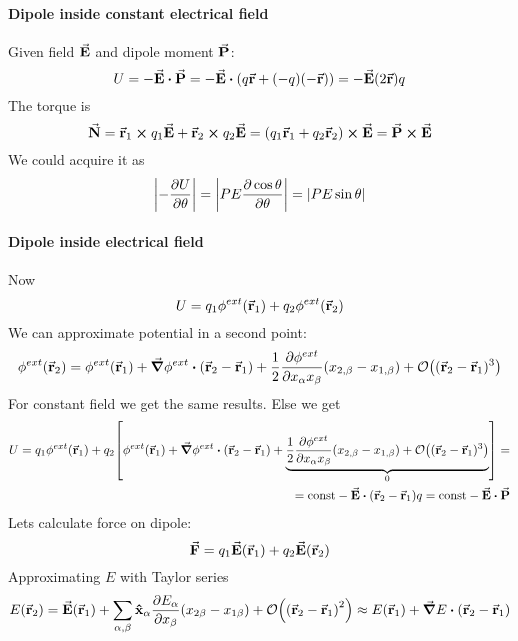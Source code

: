 \paragraph{Dipole inside constant electrical field}
Given field $\va{E}$ and dipole moment $\va{P}$:
$$U = - \va{E} \vdot \va{P} = -\va{E} \vdot \qty(q\va{r} + (-q) (-\va{r})) = -\va{E} (2\va{r})q$$
The torque is
$$\va{N}  = \va{r}_1 \cross q_1 \va{E} + \va{r}_2 \cross q_2 \va{E} = \qty(q_1\va{r}_1 + q_2 \va{r}_2)\cross  \va{E} =\va{P} \cross \va{E}$$
We could acquire it as
$$\qty|-\pdv{U}{\theta}| = \qty|PE\pdv{\cos \theta}{\theta}|  = \qty|PE\sin \theta|$$
\paragraph{Dipole inside electrical field}
Now
$$U = q_1 \phi^{ext} (\va{r}_1) + q_2 \phi^{ext} (\va{r}_2) $$
We can approximate potential in a second point:
$$\phi^{ext}(\va{r}_2) = \phi^{ext}(\va{r}_1) + \grad{\phi^{ext}} \vdot (\va{r}_2 -\va{r}_1) + \frac{1}{2} \pdv{\phi^{ext}}{x_\alpha x_\beta} (x_{2, \alpha}-x_{1, \alpha})(x_{2, \beta}-x_{1, \beta}) + \order{(\va{r}_2-\va{r}_1)^3}$$
For constant field we get the same results. Else we get
\begin{align*}
U = q_1 \phi^{ext} (\va{r}_1) + q_2 \qty[\phi^{ext}(\va{r}_1) + \grad{\phi^{ext}} \vdot (\va{r}_2 -\va{r}_1) + \underbrace{\frac{1}{2} \pdv{\phi^{ext}}{x_\alpha x_\beta} (x_{2, \alpha}-x_{1, \alpha})(x_{2, \beta}-x_{1, \beta}) + \order{(\va{r}_2-\va{r}_1)^3}}_{0}] =\\= \text{const} - \va{E}\vdot (\va{r}_2 -\va{r}_1) q =  \text{const} - \va{E}\vdot \va{P}
\end{align*}
Lets calculate force on dipole:
$$\va{F} = q_1 \va{E}(\va{r}_1) + q_2 \va{E}(\va{r}_2)$$
Approximating $E$ with Taylor series
$$E(\va{r}_2) = \va{E}(\va{r}_1) + \sum_{\alpha, \beta} \vu{x}_\alpha \pdv{E_\alpha}{x_\beta} \qty(x_{2\beta} - x_{1\beta})  + \order{\qty(\va{r}_2-\va{r}_1)^2} \approx E(\va{r}_1) + \grad{E} \vdot (\va{r}_2 - \va{r}_1)$$